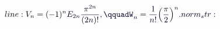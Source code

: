 \documentclass[12pt]{article}
\begin{document}
\makeatletter
\renewcommand*{\@textcolor}[3]{%
  \protect\leavevmode
  \begingroup
    \color#1{#2}#3%
  \endgroup
}
\makeatother
\begin{displaymath}
\mathcolor[RGB]{0,0,15}{line:
V_n=(-1)^n} \mathcolor[RGB]{0,0,30}{E_{2n}\frac{\pi^{2n}}{(2n)!},\qquadW_n=\frac{1}{n!}\Bigl(\frac{\pi}{2}\Bigr)^n.

norm_str:}
\end{displaymath}
\end{document}
